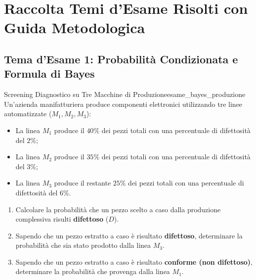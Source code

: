 \chapter{Raccolta Temi d'Esame Risolti con Guida Metodologica}
\label{cap:raccolta_esami_risolti}

\begin{abstract}
Questo capitolo finale raccoglie una selezione ragionata e completa di problemi tipici delle prove scritte d'esame di Statistica e Calcolo delle Probabilità. Ciascun esercizio è accompagnato da un'analisi preliminare della strategia risolutiva, dallo svolgimento passo-passo matematicamente rigoroso, da box di attenzione per le trappole più ricorrenti e dal confronto con approcci alternativi.
\end{abstract}

\section{Tema d'Esame 1: Probabilità Condizionata e Formula di Bayes}

\begin{esercizio}{Screening Diagnostico su Tre Macchine di Produzione}{esame_bayes_produzione}
Un'azienda manifatturiera produce componenti elettronici utilizzando tre linee automatizzate ($M_1, M_2, M_3$):
\begin{itemize}
    \item La linea $M_1$ produce il $40\%$ dei pezzi totali con una percentuale di difettosità del $2\%$;
    \item La linea $M_2$ produce il $35\%$ dei pezzi totali con una percentuale di difettosità del $3\%$;
    \item La linea $M_3$ produce il restante $25\%$ dei pezzi totali con una percentuale di difettosità del $6\%$.
\end{itemize}
\begin{enumerate}
    \item Calcolare la probabilità che un pezzo scelto a caso dalla produzione complessiva risulti \textbf{difettoso} ($D$).
    \item Sapendo che un pezzo estratto a caso è risultato \textbf{difettoso}, determinare la probabilità che sia stato prodotto dalla linea $M_3$.
    \item Sapendo che un pezzo estratto a caso è risultato \textbf{conforme (non difettoso)}, determinare la probabilità che provenga dalla linea $M_1$.
\end{enumerate}
\end{esercizio}

